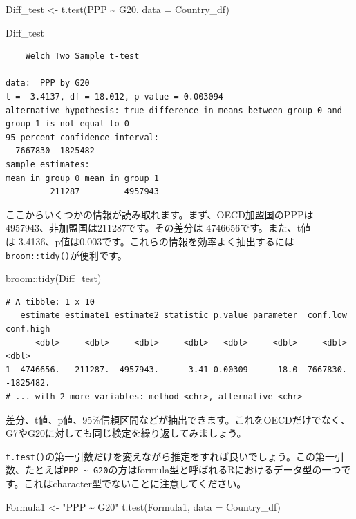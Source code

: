 \documentclass[
  a4paper,
  pandoc,
  ja=standard,
  jafont=haranoaji]{bxjsbook}
\newenvironment{Shaded}{\begin{snugshade}}{\end{snugshade}}
\newcommand{\AttributeTok}[1]{\textcolor[rgb]{0.00,0.48,0.65}{#1}}
\newcommand{\FunctionTok}[1]{\textcolor[rgb]{0.28,0.35,0.67}{#1}}
\newcommand{\NormalTok}[1]{\textcolor[rgb]{0.00,0.48,0.65}{#1}}
\newcommand{\OtherTok}[1]{\textcolor[rgb]{0.00,0.48,0.65}{#1}}
\newcommand{\SpecialCharTok}[1]{\textcolor[rgb]{0.37,0.37,0.37}{#1}}
\newcommand{\StringTok}[1]{\textcolor[rgb]{0.13,0.47,0.30}{#1}}
\begin{document}
\begin{Shaded}
\begin{Highlighting}[numbers=left,,]
\NormalTok{Diff\_test }\OtherTok{\textless{}{-}} \FunctionTok{t.test}\NormalTok{(PPP }\SpecialCharTok{\textasciitilde{}}\NormalTok{ G20, }\AttributeTok{data =}\NormalTok{ Country\_df)}

\NormalTok{Diff\_test}
\end{Highlighting}
\end{Shaded}

\begin{verbatim}
    Welch Two Sample t-test

data:  PPP by G20
t = -3.4137, df = 18.012, p-value = 0.003094
alternative hypothesis: true difference in means between group 0 and group 1 is not equal to 0
95 percent confidence interval:
 -7667830 -1825482
sample estimates:
mean in group 0 mean in group 1 
         211287         4957943 
\end{verbatim}

ここからいくつかの情報が読み取れます。まず、OECD加盟国のPPPは4957943、非加盟国は211287です。その差分は-4746656です。また、t値は-3.4136、p値は0.003です。これらの情報を効率よく抽出するには\texttt{broom::tidy()}が便利です。

\begin{Shaded}
\begin{Highlighting}[numbers=left,,]
\NormalTok{broom}\SpecialCharTok{::}\FunctionTok{tidy}\NormalTok{(Diff\_test)}
\end{Highlighting}
\end{Shaded}

\begin{verbatim}
# A tibble: 1 x 10
   estimate estimate1 estimate2 statistic p.value parameter  conf.low conf.high
      <dbl>     <dbl>     <dbl>     <dbl>   <dbl>     <dbl>     <dbl>     <dbl>
1 -4746656.   211287.  4957943.     -3.41 0.00309      18.0 -7667830. -1825482.
# ... with 2 more variables: method <chr>, alternative <chr>
\end{verbatim}

差分、t値、p値、95\%信頼区間などが抽出できます。これをOECDだけでなく、G7やG20に対しても同じ検定を繰り返してみましょう。

\texttt{t.test()}の第一引数だけを変えながら推定をすれば良いでしょう。この第一引数、たとえば\texttt{PPP\ \textasciitilde{}\ G20}の方はformula型と呼ばれるRにおけるデータ型の一つです。これはcharacter型でないことに注意してください。

\begin{Shaded}
\begin{Highlighting}[numbers=left,,]
\NormalTok{Formula1 }\OtherTok{\textless{}{-}} \StringTok{"PPP \textasciitilde{} G20"}
\FunctionTok{t.test}\NormalTok{(Formula1, }\AttributeTok{data =}\NormalTok{ Country\_df)}
\end{Highlighting}
\end{Shaded}
\end{document}
